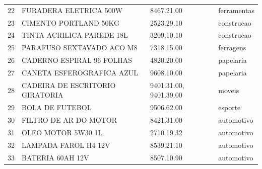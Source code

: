 \begin{apendicesenv}
\begin{center}
\begin{longtable}{r p{6.6cm} p{4.4cm} p{2.6cm}}
22 & FURADERA ELETRICA 500W & 8467.21.00 & ferramentas \\
23 & CIMENTO PORTLAND 50KG & 2523.29.10 & construcao \\
24 & TINTA ACRILICA PAREDE 18L & 3209.10.10 & construcao \\
25 & PARAFUSO SEXTAVADO ACO M8 & 7318.15.00 & ferragens \\
26 & CADERNO ESPIRAL 96 FOLHAS & 4820.20.00 & papelaria \\
27 & CANETA ESFEROGRAFICA AZUL & 9608.10.00 & papelaria \\
28 & CADEIRA DE ESCRITORIO GIRATORIA & 9401.31.00, 9401.39.00 & moveis \\
29 & BOLA DE FUTEBOL & 9506.62.00 & esporte \\
30 & FILTRO DE AR DO MOTOR & 8421.31.00 & automotivo \\
31 & OLEO MOTOR 5W30 1L & 2710.19.32 & automotivo \\
32 & LAMPADA FAROL H4 12V & 8539.21.10 & automotivo \\
33 & BATERIA 60AH 12V & 8507.10.90 & automotivo \\
\end{longtable}
\end{center}


\end{apendicesenv}
